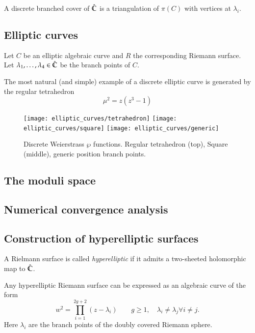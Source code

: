 \documentclass[Thesis.tex]{subfiles}
\begin{document}
A discrete branched cover of $\hat{\mathbb C}$ is a triangulation of $\pi(C)$ with vertices at $\lambda_i$.


\subsection{Elliptic curves}

Let $C$ be an elliptic algebraic curve and $R$ the corresponding Riemann surface. Let $\lambda_1, \ldots, \lambda_4 \in \hat{\mathbb C}$ be the branch points of $C$. 

\begin{example}
The most natural (and simple) example of a discrete elliptic curve is generated by the regular tetrahedron
\begin{equation}
	\mu^2=z(z^3-1)
\end{equation}

\end{example}

\begin{figure}[p]
	\texttt{[image: elliptic\_curves/tetrahedron]}
	\texttt{[image: elliptic\_curves/square]}
	\texttt{[image: elliptic\_curves/generic]}
	\caption{Discrete Weierstrass $\wp$ functions. Regular tetrahedron (top), Square
	(middle), generic position branch points.}
\end{figure}

\subsection{The moduli space}
\subsection{Numerical convergence analysis}

\subsection{Construction of hyperelliptic surfaces}

\begin{definition}
	A Rielmann surface is called \emph{hyperelliptic} if it admits a two-sheeted holomorphic map to
$\hat{\mathbb C}$.
\end{definition}

Any hyperelliptic Riemann surface can be expressed as an algebraic curve of the form
\[ w^2 = \prod_{i=1}^{2g+2}(z-\lambda_i) \quad\quad g\geq1,\quad \lambda_i\neq \lambda_j \forall i\neq j.\]
Here $\lambda_i$ are the branch points of the doubly covered Riemann sphere.
\end{document}
